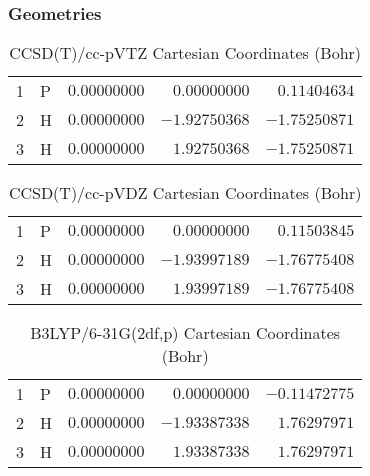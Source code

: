 \documentclass[10pt,oneside]{article}
\begin{document}
\clearpage

\subsection{\ \ \ }

\subsubsection*{Geometries}
\begin{table}[h!]
\centering
\caption{CCSD(T)/cc-pVTZ Cartesian Coordinates (Bohr)}
\begin{tabular}{llrrr}
1  & P  & $ 0.00000000$ & $ 0.00000000$ & $ 0.11404634$ \\
2  & H  & $ 0.00000000$ & $-1.92750368$ & $-1.75250871$ \\
3  & H  & $ 0.00000000$ & $ 1.92750368$ & $-1.75250871$ \\
\end{tabular}
\end{table}

\begin{table}[h!]
\centering
\caption{CCSD(T)/cc-pVDZ Cartesian Coordinates (Bohr)}
\begin{tabular}{llrrr}
1  & P  & $ 0.00000000$ & $ 0.00000000$ & $ 0.11503845$ \\
2  & H  & $ 0.00000000$ & $-1.93997189$ & $-1.76775408$ \\
3  & H  & $ 0.00000000$ & $ 1.93997189$ & $-1.76775408$ \\
\end{tabular}
\end{table}

\begin{table}[h!]
\centering
\caption{B3LYP/6-31G(2df,p) Cartesian Coordinates (Bohr)}
\begin{tabular}{llrrr}
1  & P  & $ 0.00000000$ & $ 0.00000000$ & $-0.11472775$ \\
2  & H  & $ 0.00000000$ & $-1.93387338$ & $ 1.76297971$ \\
3  & H  & $ 0.00000000$ & $ 1.93387338$ & $ 1.76297971$ \\
\end{tabular}
\end{table}

\clearpage
\end{document}
